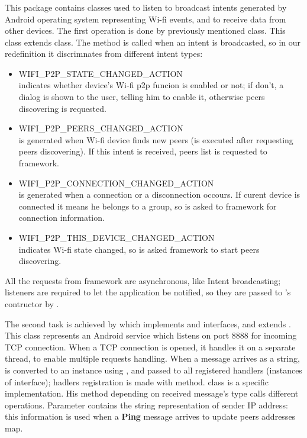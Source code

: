 	\subsubsection{}
	This package contains classes used to listen to broadcast intents generated by Android operating system representing Wi-fi events, and to receive data from other devices.
	The first operation is done by previously mentioned  class. This class extends  class. The method  is called when an intent is broadcasted, so in our redefinition it discrimnates from different intent types:
	\begin{itemize}
		\item WIFI\_P2P\_STATE\_CHANGED\_ACTION \hfill \\
		indicates whether device's Wi-fi p2p funcion is enabled or not; if don't, a dialog is shown to the user, telling him to enable it, otherwise peers discovering is requested.
		\item WIFI\_P2P\_PEERS\_CHANGED\_ACTION \hfill \\
		is generated when Wi-fi device finds new peers (is executed after requesting peers discovering). If this intent is received, peers list is requested to \direct framework.
		\item WIFI\_P2P\_CONNECTION\_CHANGED\_ACTION \hfill \\
		is generated when a connection or a disconnection occours. If curent device is connected it means he belongs to a \direct group, so is asked to \direct framework for connection information.
		\item WIFI\_P2P\_THIS\_DEVICE\_CHANGED\_ACTION \hfill \\
		indicates Wi-fi state changed, so is asked \direct framework to start peers discovering.		
	\end{itemize}

All the requests from \direct framework are asynchronous, like Intent broadcasting; listeners are required to let the application be notified, so they are passed to 's contructor by .
	
	The second task is achieved by  which implements  and  interfaces, and extends . This class represents an Android service which listens on port 8888 for incoming TCP connection. When a TCP connection is opened, it handles it on a separate thread, to enable multiple requests handling. When a message arrives as a string, is converted to an  instance using , and passed to all registered handlers (instances of  interface); hadlers registration is made with  method.
	 class is a specific  implementation. His method  depending on received message's type calls different  operations. Parameter  contains the string representation of sender IP address: this information is used when a \textbf{Ping} message arrives to update peers addresses map.
	

